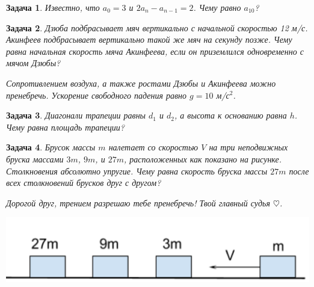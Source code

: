 \documentclass[a4paper, 12pt]{article}
\theoremstyle{break}
\newtheorem{problem}{Задача}[subsection]
\begin{document}
\begin{problem}
Известно, что $a_0 = 3$ и $2a_n - a_{n-1} = 2$. Чему равно $a_{10}$?
\end{problem}

\begin{problem}
Дзюба подбрасывает мяч вертикально с начальной скоростью 12 м/с.
Акинфеев подбрасывает вертикально такой же мяч на секунду позже.
Чему равна начальная скорость мяча Акинфеева,
если он приземлился одновременно с мячом Дзюбы?

Сопротивлением воздуха, а также ростами Дзюбы и Акинфеева можно пренебречь.
Ускорение свободного падения равно $g=10$ м/с$^2$.
\end{problem}



\begin{problem}
Диагонали трапеции равны $d_1$ и $d_2$, а высота к основанию равна $h$. Чему равна площадь трапеции?
\end{problem}



\begin{problem}
Брусок массы $m$ налетает со скоростью $V$ на три неподвижных бруска массами $3m$, $9m$, и $27m$,
расположенных как показано на рисунке. Столкновения абсолютно упругие.
Чему равна скорость бруска массы $27m$ после всех столкновений брусков друг с другом?

Дорогой друг, трением разрешаю тебе пренебречь! Твой главный судья $\heartsuit$.

\includegraphics[scale=0.3]{images/m_3m_27m_nowall.png}
\end{problem}
\end{document}

